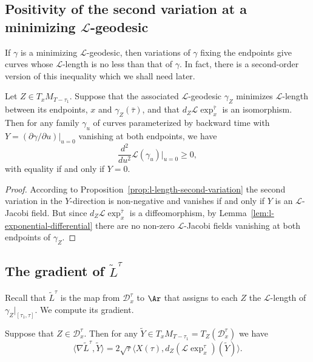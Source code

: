 \subsection{Positivity of the second variation at a minimizing
${\mathcal L}$-geodesic}


If $\gamma$ is a minimizing ${\mathcal L}$-geodesic, then variations
of $\gamma$ fixing the endpoints  give curves whose ${\mathcal
L}$-length is no less than that of $\gamma$. In fact, there is a
second-order version of this inequality which we shall need later.

\begin{corollary}\label{cor:l-length-second-variation-positive}
\label{posform}
Let $Z\in T_xM_{T-\tau_1}$. Suppose that the associated ${\mathcal
L}$-geodesic $\gamma_Z$ minimizes ${\mathcal L}$-length between its
endpoints, $x$ and $\gamma_Z(\bar\tau)$, and that $d_Z{\mathcal
L}\exp^{\bar\tau}_x$ is an isomorphism. Then for any family
$\gamma_u$ of curves parameterized by backward time with
$Y=(\partial \gamma/\partial u)|_{u=0}$ vanishing at both endpoints,
we have
$$\frac{d^2}{du^2}{\mathcal L}(\gamma_u)|_{u=0}\ge 0,$$
with equality if and only if $Y=0$.
\end{corollary}

\begin{proof}
\sketch
{}
According to Proposition~\ref{prop:l-length-second-variation} the second variation  in the
$Y$-direction is non-negative and vanishes if and only if $Y$ is an ${\mathcal
L}$-Jacobi field. But since $d_Z{\mathcal L}\exp_x^{\bar\tau}$ is a
diffeomorphism, by Lemma~\ref{lem:l-exponential-differential} there are no non-zero ${\mathcal
L}$-Jacobi fields vanishing at both endpoints of $\gamma_Z$.
\end{proof}



\subsection{The gradient of $\widetilde L^\tau$}

Recall that $\widetilde
L^{\tau}$ is the map from ${\mathcal D}^{\tau}_x$ to $\Ar$ that
assigns to each $Z$ the ${\mathcal L}$-length of
$\gamma_Z|_{[\tau_1,\tau]}$. We compute its gradient.




\begin{lemma}\label{lem:l-length-tilde-gradient}
\label{DtildeL}
Suppose that $Z\in {\mathcal D}^{\tau}_x$. Then for any $\widetilde
Y\in T_xM_{T-\tau_1}=T_Z({\mathcal D}^{\tau}_x)$ we have
$$ \langle \nabla\widetilde L^{\tau},\widetilde Y\rangle =2\sqrt{\tau}\langle
X(\tau),d_Z\left({\mathcal L}\exp_x^{\tau}\right)(\widetilde
Y)\rangle.$$
\end{lemma}



